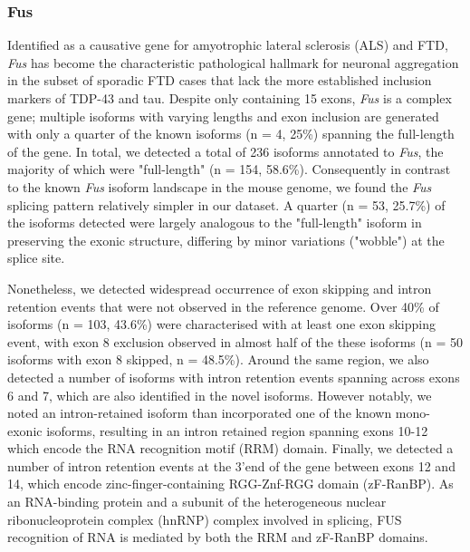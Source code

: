 \subsubsection{Fus}
Identified as a causative gene for amyotrophic lateral sclerosis (ALS) and FTD, \textit{Fus} has become the characteristic pathological hallmark for neuronal aggregation in the subset of sporadic FTD cases that lack the more established inclusion markers of TDP-43 and tau\cite{Seelaar2010}. Despite only containing 15 exons, \textit{Fus} is a complex gene; multiple isoforms with varying lengths and exon inclusion are generated with only a quarter of the known isoforms (n = 4, 25\%) spanning the full-length of the gene. In total, we detected a total of 236 isoforms annotated to \textit{Fus}, the majority of which were "full-length" (n = 154, 58.6\%). Consequently in contrast to the known \textit{Fus} isoform landscape in the mouse genome, we found the \textit{Fus} splicing pattern relatively simpler in our dataset. A quarter (n = 53, 25.7\%) of the isoforms detected were largely analogous to the "full-length" isoform in preserving the exonic structure, differing by minor variations ("wobble") at the splice site. 

Nonetheless, we detected widespread occurrence of exon skipping and intron retention events that were not observed in the reference genome. Over 40\% of isoforms (n = 103, 43.6\%) were characterised with at least one exon skipping event, with exon 8 exclusion observed in almost half of the these isoforms (n = 50 isoforms with exon 8 skipped, n = 48.5\%). Around the same region, we also detected a number of isoforms with intron retention events spanning across exons 6 and 7, which are also identified in the novel isoforms. However notably, we noted an intron-retained isoform than incorporated one of the known mono-exonic isoforms, resulting in an intron retained region spanning exons 10-12 which encode the RNA recognition motif (RRM) domain. Finally, we detected a number of intron retention events at the 3'end of the gene between exons 12 and 14, which encode zinc-finger-containing RGG-Znf-RGG domain (zF-RanBP). As an RNA-binding protein and a subunit of the heterogeneous nuclear ribonucleoprotein complex (hnRNP) complex involved in splicing, FUS recognition of RNA is mediated by both the RRM and zF-RanBP domains\cite{Wang2015c}. 

